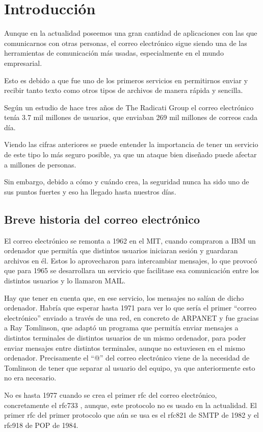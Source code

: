 \chapter{Introducción}
Aunque en la actualidad poseemos una gran cantidad de aplicaciones con las que comunicarnos con otras personas, el correo electrónico sigue siendo una de las herramientas de comunicación más usadas, especialmente en el mundo empresarial. 

Esto es debido a que fue uno de los primeros servicios en permitirnos enviar y recibir tanto texto como otros tipos de archivos de manera rápida y sencilla. 

Según un estudio de hace tres años de The Radicati Group el correo electrónico tenía 3.7 mil millones de usuarios, que enviaban 269 mil millones de correos cada día. \cite{cifrasCorreo}

Viendo las cifras anteriores se puede entender la importancia de tener un servicio de este tipo lo más seguro posible, ya que un ataque bien diseñado puede afectar a millones de personas.

Sin embargo, debido a cómo y cuándo crea, la seguridad nunca ha sido uno de sus puntos fuertes y eso ha llegado hasta nuestros días.
 
\section{Breve historia del correo electrónico}
El correo electrónico se remonta a 1962 en el MIT, cuando compraron a IBM un ordenador que permitía que distintos usuarios iniciaran sesión y guardaran archivos en él. Estos lo aprovecharon para intercambiar mensajes, lo que provocó que para 1965 se desarrollara un servicio que facilitase esa comunicación entre los distintos usuarios y lo llamaron MAIL.

Hay que tener en cuenta que, en ese servicio, los mensajes no salían de dicho ordenador. Habría que esperar hasta 1971 para ver lo que sería el primer “correo electrónico” enviado a través de una red, en concreto de ARPANET y fue gracias a Ray Tomlinson, que adaptó un programa que permitía enviar mensajes a distintos terminales de distintos usuarios de un mismo ordenador, para poder enviar mensajes entre distintos terminales, aunque no estuviesen en el mismo ordenador. Precisamente el “@” del correo electrónico viene de la necesidad de Tomlinson de tener que separar al usuario del equipo, ya que anteriormente esto no era necesario.

No es hasta 1977 cuando se crea el primer rfc del correo electrónico, concretamente el rfc733 \cite{rfc733}, aunque, este protocolo no es usado en la actualidad. El primer rfc del primer protocolo que aún se usa es el rfc821 \cite{rfc821}  de SMTP de 1982 y el rfc918 \cite{rfc918}  de POP de 1984.

